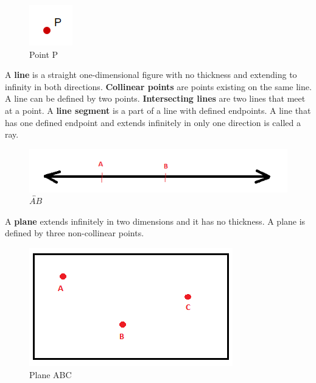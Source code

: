         \begin{figure} [hbt!]
            \centering
            \includegraphics[scale = 0.5] {Resources/Unit1Basics/point.PNG}
            \caption*{Point P}
        \end{figure}

        \noindent A \textbf{line} is a straight one-dimensional figure with no thickness and
        extending to infinity in both directions. \textbf{Collinear points} are points existing
        on the same line. A line can be defined by two points. \textbf{Intersecting lines} are
        two lines that meet at a point. A \textbf{line segment} is a part of a line with defined
        endpoints. A line that has one defined endpoint and extends infinitely in only one
        direction is called a ray. \\

        \begin{figure} [hbt!]
            \centering
            \includegraphics[scale = 0.5] {Resources/Unit1Basics/line.PNG}
            \caption*{$\overleftrightarrow{AB}$}
        \end{figure}

        \noindent A \textbf{plane} extends infinitely in two dimensions and it has no thickness.
        A plane is defined by three non-collinear points. \\

        \begin{figure} [hbt!]
            \centering
            \includegraphics[scale = 0.3] {Resources/Unit1Basics/plane.PNG}
            \caption*{Plane ABC}
        \end{figure}

